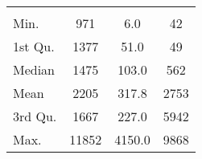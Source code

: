 \begin{tabular}{lS[table-format=5.1]S[table-format=5.1]S[table-format=5.1]}
&  &  &  \\
 Min.    & 971 & 6.0 & 42 \\
 1st Qu. & 1377 & 51.0 & 49 \\
 Median  & 1475 & 103.0 & 562 \\
 Mean    & 2205 & 317.8 & 2753 \\
 3rd Qu. & 1667 & 227.0 & 5942 \\
 Max.    & 11852 & 4150.0 & 9868 \\
\end{tabular}
